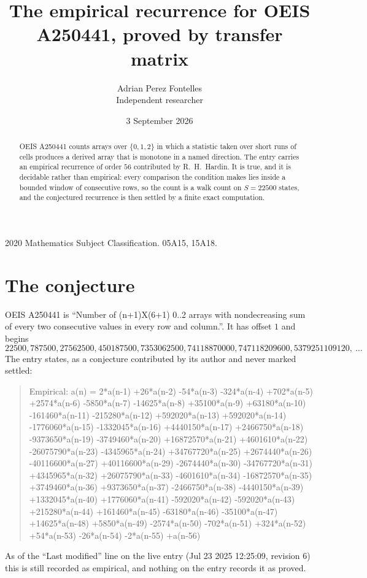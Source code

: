 \documentclass[11pt,a4paper]{article}
\title{The empirical recurrence for OEIS A250441, proved by transfer matrix}
\author{Adrian Perez Fontelles\\ \small Independent researcher}
\date{3 September 2026}
\theoremstyle{plain}
\theoremstyle{definition}
\begin{document}
\maketitle

\begin{abstract}
OEIS A250441 counts arrays over $\{0,1,2\}$ in which a statistic taken over short runs
of cells produces a derived array that is monotone in a named direction. The entry carries an
empirical recurrence of order $56$ contributed by R.~H.~Hardin. It is true, and it is
decidable rather than empirical: every comparison the condition makes lies inside a bounded
window of consecutive rows, so the count is a walk count on $S=22500$ states, and the
conjectured recurrence is then settled by a finite exact computation.
\end{abstract}

\noindent\small 2020 Mathematics Subject Classification. 05A15, 15A18.\normalsize

\section{The conjecture}

OEIS A250441 is ``Number of (n+1)X(6+1) 0..2 arrays with nondecreasing sum of every two consecutive values in every row and column.''. It has offset $1$ and begins
\[
22500, 787500, 27562500, 450187500, 7353062500, 74118870000, 747118209600, 5379251109120,\ \dots
\]
The entry states, as a conjecture contributed by its author and never marked settled:
\begin{quote}
Empirical: a(n) = 2*a(n-1) +26*a(n-2) -54*a(n-3) -324*a(n-4) +702*a(n-5) +2574*a(n-6) -5850*a(n-7) -14625*a(n-8) +35100*a(n-9) +63180*a(n-10) -161460*a(n-11) -215280*a(n-12) +592020*a(n-13) +592020*a(n-14) -1776060*a(n-15) -1332045*a(n-16) +4440150*a(n-17) +2466750*a(n-18) -9373650*a(n-19) -3749460*a(n-20) +16872570*a(n-21) +4601610*a(n-22) -26075790*a(n-23) -4345965*a(n-24) +34767720*a(n-25) +2674440*a(n-26) -40116600*a(n-27) +40116600*a(n-29) -2674440*a(n-30) -34767720*a(n-31) +4345965*a(n-32) +26075790*a(n-33) -4601610*a(n-34) -16872570*a(n-35) +3749460*a(n-36) +9373650*a(n-37) -2466750*a(n-38) -4440150*a(n-39) +1332045*a(n-40) +1776060*a(n-41) -592020*a(n-42) -592020*a(n-43) +215280*a(n-44) +161460*a(n-45) -63180*a(n-46) -35100*a(n-47) +14625*a(n-48) +5850*a(n-49) -2574*a(n-50) -702*a(n-51) +324*a(n-52) +54*a(n-53) -26*a(n-54) -2*a(n-55) +a(n-56)
\end{quote}
As of the ``Last modified'' line on the live entry (Jul 23 2025 12:25:09, revision 6) this is still
recorded as empirical, and nothing on the entry records it as proved.
\end{document}
